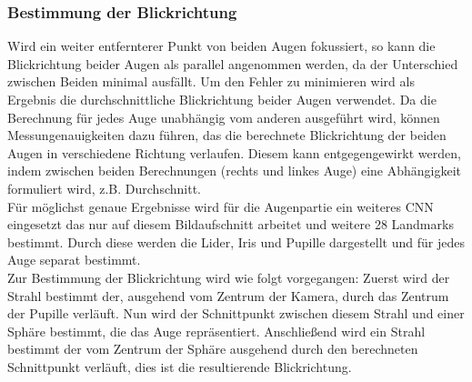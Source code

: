 \subsubsection{Bestimmung der Blickrichtung}
\label{OpenFace_Blickrichtung}
Wird ein weiter entfernterer Punkt von beiden Augen fokussiert, so kann die Blickrichtung beider Augen als parallel angenommen werden, da der Unterschied zwischen Beiden minimal ausfällt. Um den Fehler zu minimieren wird als Ergebnis die durchschnittliche Blickrichtung beider Augen verwendet. Da die Berechnung für jedes Auge unabhängig vom anderen ausgeführt wird, können Messungenauigkeiten dazu führen, das die berechnete Blickrichtung der beiden Augen in verschiedene Richtung verlaufen. Diesem kann entgegengewirkt werden, indem zwischen beiden Berechnungen (rechts und linkes Auge) eine Abhängigkeit formuliert wird, z.B. Durchschnitt.\\
Für möglichst genaue Ergebnisse wird für die Augenpartie ein weiteres CNN eingesetzt das nur auf diesem Bildaufschnitt arbeitet und weitere 28 Landmarks bestimmt. Durch diese werden die Lider, Iris und Pupille dargestellt und für jedes Auge separat bestimmt.\\
Zur Bestimmung der Blickrichtung wird wie folgt vorgegangen: Zuerst wird der Strahl bestimmt der, ausgehend vom Zentrum der Kamera, durch das Zentrum der Pupille verläuft. Nun wird der Schnittpunkt zwischen diesem Strahl und einer Sphäre bestimmt, die das Auge repräsentiert. Anschließend wird ein Strahl bestimmt der vom Zentrum der Sphäre ausgehend durch den berechneten Schnittpunkt verläuft, dies ist die resultierende Blickrichtung.
